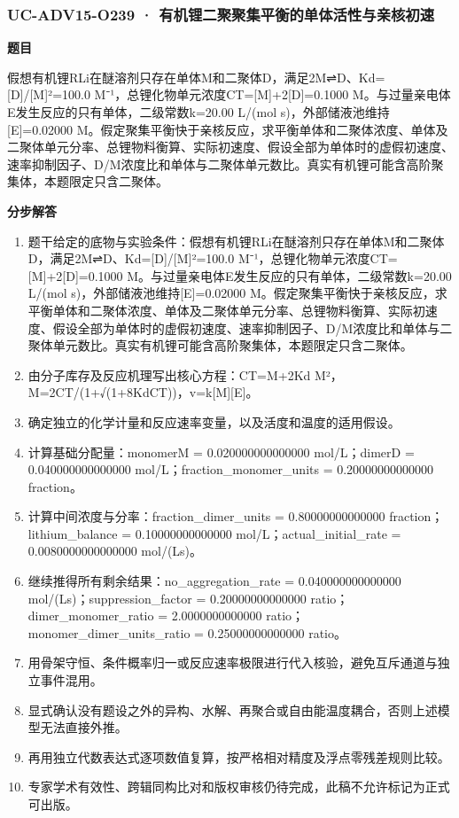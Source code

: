 \documentclass[UTF8,11pt,a4paper]{ctexart}
\begin{document}
\subsubsection*{UC-ADV15-O239 · 有机锂二聚聚集平衡的单体活性与亲核初速}
\noindent\textbf{题目}\par
假想有机锂RLi在醚溶剂只存在单体M和二聚体D，满足2M⇌D、Kd=[D]/[M]²=100.0 M⁻¹，总锂化物单元浓度CT=[M]+2[D]=0.1000 M。与过量亲电体E发生反应的只有单体，二级常数k=20.00 L/(mol s)，外部储液池维持[E]=0.02000 M。假定聚集平衡快于亲核反应，求平衡单体和二聚体浓度、单体及二聚体单元分率、总锂物料衡算、实际初速度、假设全部为单体时的虚假初速度、速率抑制因子、D/M浓度比和单体与二聚体单元数比。真实有机锂可能含高阶聚集体，本题限定只含二聚体。\par
\medskip\noindent\textbf{分步解答}
\begin{enumerate}
\item 题干给定的底物与实验条件：假想有机锂RLi在醚溶剂只存在单体M和二聚体D，满足2M⇌D、Kd=[D]/[M]²=100.0 M⁻¹，总锂化物单元浓度CT=[M]+2[D]=0.1000 M。与过量亲电体E发生反应的只有单体，二级常数k=20.00 L/(mol s)，外部储液池维持[E]=0.02000 M。假定聚集平衡快于亲核反应，求平衡单体和二聚体浓度、单体及二聚体单元分率、总锂物料衡算、实际初速度、假设全部为单体时的虚假初速度、速率抑制因子、D/M浓度比和单体与二聚体单元数比。真实有机锂可能含高阶聚集体，本题限定只含二聚体。
\item 由分子库存及反应机理写出核心方程：CT=M+2Kd M²，M=2CT/(1+√(1+8KdCT))，v=k[M][E]。
\item 确定独立的化学计量和反应速率变量，以及活度和温度的适用假设。
\item 计算基础分配量：monomerM = 0.020000000000000 mol/L；dimerD = 0.040000000000000 mol/L；fraction\_monomer\_units = 0.20000000000000 fraction。
\item 计算中间浓度与分率：fraction\_dimer\_units = 0.80000000000000 fraction；lithium\_balance = 0.10000000000000 mol/L；actual\_initial\_rate = 0.0080000000000000 mol/(Ls)。
\item 继续推得所有剩余结果：no\_aggregation\_rate = 0.040000000000000 mol/(Ls)；suppression\_factor = 0.20000000000000 ratio；dimer\_monomer\_ratio = 2.0000000000000 ratio；monomer\_dimer\_units\_ratio = 0.25000000000000 ratio。
\item 用骨架守恒、条件概率归一或反应速率极限进行代入核验，避免互斥通道与独立事件混用。
\item 显式确认没有题设之外的异构、水解、再聚合或自由能温度耦合，否则上述模型无法直接外推。
\item 再用独立代数表达式逐项数值复算，按严格相对精度及浮点零残差规则比较。
\item 专家学术有效性、跨辑同构比对和版权审核仍待完成，此稿不允许标记为正式可出版。
\end{enumerate}
\end{document}
